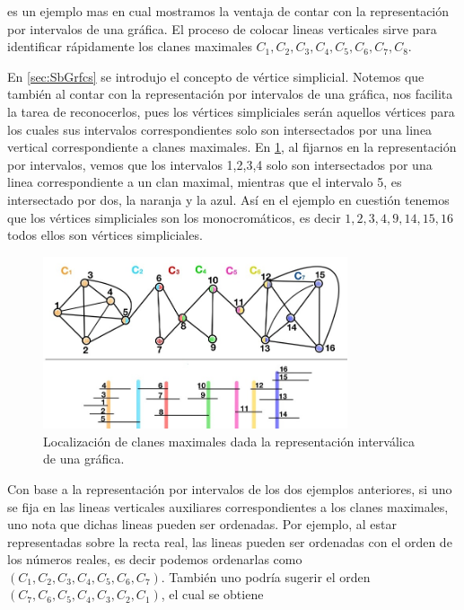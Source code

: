  es un ejemplo mas en cual mostramos la ventaja de contar con la representación por intervalos de una gráfica. El proceso de colocar lineas verticales sirve para identificar rápidamente los clanes maximales $C_1,C_2, C_3, C_4, C_5, C_6, C_7, C_8$.

En \cref{sec:SbGrfcs} se introdujo el concepto de vértice simplicial. Notemos que también al contar con la representación por intervalos de una gráfica, nos facilita la tarea de reconocerlos, pues los vértices simpliciales serán aquellos vértices para los cuales sus intervalos  correspondientes solo son intersectados por una linea vertical correspondiente a clanes maximales. En \cref{fig:209}, al fijarnos en la representación por intervalos, vemos que los intervalos 1,2,3,4 solo son intersectados por una linea correspondiente a un clan maximal, mientras que el intervalo 5, es intersectado por dos, la naranja y la azul. Así en el ejemplo en cuestión tenemos que los vértices simpliciales son los monocrom\'aticos, es decir $1,2,3,4,9,14,15,16$ todos ellos son vértices simpliciales.

\begin{figure}[H]
  \centering
  \includegraphics[width=0.8\textwidth]{recursos/capturas/209.jpg}
  \caption{Localización de clanes maximales dada la representación interválica de una gráfica.}
  \label{fig:209}
\end{figure}

Con base a la representación por intervalos de los dos ejemplos anteriores, si uno se fija en las lineas verticales auxiliares correspondientes a los clanes maximales, uno nota que dichas lineas pueden ser ordenadas. Por ejemplo, al estar representadas sobre la recta real, las lineas pueden ser ordenadas con el orden de los números reales, es decir podemos ordenarlas como $(C_1,C_2, C_3, C_4, C_5, C_6, C_7)$. También uno podría sugerir el orden $(C_7,C_6,C_5,C_4,C_3,C_2,C_1)$, el cual se obtiene 


